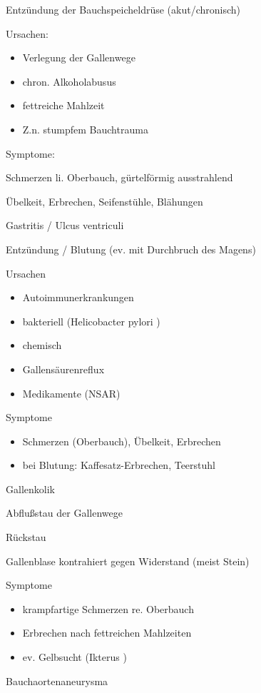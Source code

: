 \documentclass{article}
\begin{document}
Entz\"undung der Bauchspeicheldr\"use  (akut/chronisch)

Ursachen:

\begin{itemize}
\item Verlegung der Gallenwege

\item chron. Alkoholabusus

\item fettreiche Mahlzeit

\item Z.n. stumpfem Bauchtrauma

\end{itemize}
Symptome:

Schmerzen li. Oberbauch, g\"urtelf\"ormig  ausstrahlend

\"Ubelkeit, Erbrechen, Seifenst\"uhle, Bl\"ahungen

Gastritis / Ulcus ventriculi

Entz\"undung / Blutung (ev. mit  Durchbruch des Magens)

Ursachen

\begin{itemize}
\item Autoimmunerkrankungen

\item bakteriell (Helicobacter pylori )

\item chemisch

\item Gallens\"aurenreflux

\item Medikamente (NSAR)

\end{itemize}
Symptome

\begin{itemize}
\item Schmerzen (Oberbauch), \"Ubelkeit, Erbrechen

\item bei Blutung: Kaffesatz-Erbrechen,  Teerstuhl

\end{itemize}
Gallenkolik

Abflu{\ss}stau der Gallenwege

R\"uckstau

Gallenblase kontrahiert gegen Widerstand  (meist Stein)

Symptome

\begin{itemize}
\item krampfartige Schmerzen re. Oberbauch

\item Erbrechen nach fettreichen Mahlzeiten

\item ev. Gelbsucht (Ikterus )

\end{itemize}
Bauchaortenaneurysma
\end{document}
